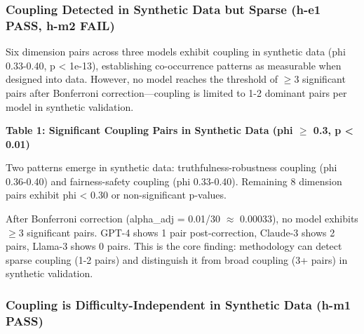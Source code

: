 
\subsubsection{Coupling Detected in Synthetic Data but Sparse (h-e1 PASS, h-m2 FAIL)}

Six dimension pairs across three models exhibit coupling in synthetic data (phi 0.33-0.40, p < 1e-13), establishing co-occurrence patterns as measurable when designed into data. However, no model reaches the threshold of $\geq 3$ significant pairs after Bonferroni correction---coupling is limited to 1-2 dominant pairs per model in synthetic validation.

\textbf{Table 1: Significant Coupling Pairs in Synthetic Data (phi $\geq$ 0.3, p < 0.01)}

\begin{table}[htbp]
\centering
{}
\end{table}

Two patterns emerge in synthetic data: truthfulness-robustness coupling (phi 0.36-0.40) and fairness-safety coupling (phi 0.33-0.40). Remaining 8 dimension pairs exhibit phi < 0.30 or non-significant p-values.

After Bonferroni correction (alpha\_adj = 0.01/30 $\approx$ 0.00033), no model exhibits $\geq 3$ significant pairs. GPT-4 shows 1 pair post-correction, Claude-3 shows 2 pairs, Llama-3 shows 0 pairs. This is the core finding: methodology can detect sparse coupling (1-2 pairs) and distinguish it from broad coupling (3+ pairs) in synthetic validation.

\subsubsection{Coupling is Difficulty-Independent in Synthetic Data (h-m1 PASS)}

